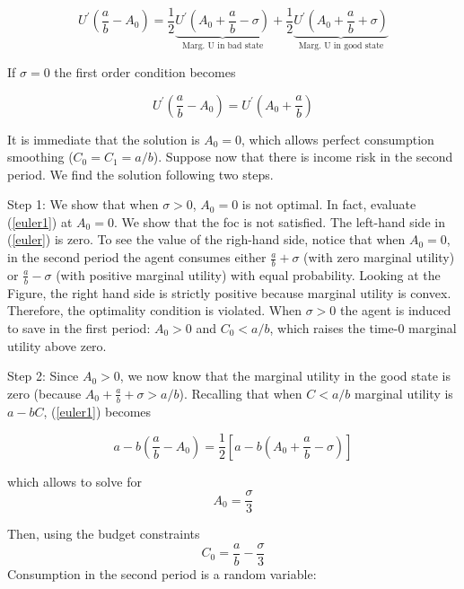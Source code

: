 \documentclass[a4paper,11pt]{article}
\begin{document}
\begin{enumerate}
\begin{equation}
U^{\prime}(\frac{a}{b}-A_0)= \frac{1}{2} \underset{\text{Marg. U in bad state}}{\underbrace{U^{\prime}(A_0+\frac{a}{b}-\sigma)}} + \frac{1}{2} \underset{\text{Marg. U in good state}}{\underbrace{U^{\prime}(A_0+\frac{a}{b}+\sigma)}}
\label{euler1}
\end{equation}%




If $\sigma=0$ the first order condition becomes 

\begin{equation}
U^{\prime}(\frac{a}{b}-A_0)=  U^{\prime}(A_0+\frac{a}{b})
\label{2 - CB1}
\end{equation}%

It is immediate that the solution is $A_0=0$, which allows perfect consumption smoothing ($ C_0=C_1=a/b $). Suppose now that there is income risk in the second period. We find the solution following two steps. 


Step 1: We show that when $\sigma>0$, $A_0=0$ is not optimal.  In fact, evaluate  (\ref{euler1}) at $A_0=0$. We show that the foc is not satisfied. The left-hand side in (\ref{euler}) is zero. To see the value of the righ-hand side, notice that when $A_0=0$, in the second period the agent consumes either $\frac{a}{b}+\sigma$ (with zero marginal utility) or $\frac{a}{b}-\sigma$ (with positive marginal utility) with equal probability. Looking at the Figure, the right hand side is strictly positive because marginal utility is convex.  Therefore, the optimality condition is violated. When $\sigma>0$ the agent is induced to save in the first period: $A_0>0$ and $C_0<a/b$, which raises the time-0 marginal utility above zero. 

Step 2: Since  $A_0>0$, we now know that the marginal utility in the good state is zero (because $A_0+\frac{a}{b}+\sigma>a/b$). Recalling that when $C<a/b$ marginal utility is $a-bC$, (\ref{euler1}) becomes

\begin{equation}
a-b(\frac{a}{b}-A_0) =  \frac{1}{2} [a-b (A_0+\frac{a}{b}-\sigma)]
\label{euler}
\end{equation}%

which allows to solve for \begin{equation}A_0= \frac{\sigma}{3} \end{equation}

Then, using the budget constraints
\begin{equation}
C_{0} =\frac{a}{b}-\frac{\sigma}{3} 
\label{2 - CB}
\end{equation}
Consumption in the second period is a random variable: 



\end{enumerate}
\end{document}

